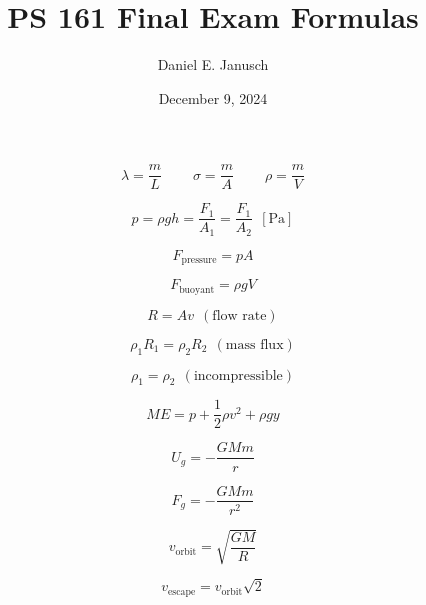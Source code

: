 \documentclass[12pt]{article}
\begin{document}

\title{PS 161 Final Exam Formulas}
\author{Daniel E. Janusch}
\date{December 9, 2024}
\maketitle
\fi

\begin{equation}
	\lambda = \dfrac mL ~~~~~~~~~~
	\sigma = \dfrac mA ~~~~~~~~~~
	\rho = \dfrac mV
\end{equation}

\begin{equation}
	p = \rho g h = \dfrac{F_1}{A_1} = \dfrac{F_1}{A_2}~~[\text{Pa}]
\end{equation}

\begin{equation}
	F_{\text{pressure}} = p A
\end{equation}

\begin{equation}
	F_{\text{buoyant}} = \rho g V
\end{equation}

\begin{equation}
	R = A v~~(\text{flow rate})
\end{equation}

\begin{equation}
	\rho_1 R_1 = \rho_2 R_2~~(\text{mass flux})
\end{equation}

\begin{equation}
	\rho_1 = \rho_2~~(\text{incompressible})
\end{equation}

\begin{equation}
	M\!E = p + \dfrac 12 \rho v^2 + \rho g y
\end{equation}

\begin{equation}
	U_g = -\dfrac{GMm} r
\end{equation}

\begin{equation}
	F_g = -\dfrac{GMm}{r^2}
\end{equation}

\begin{equation}
	v_{\text{orbit}} = \sqrt{\dfrac{GM}{R}}
\end{equation}

\begin{equation}
	v_{\text{escape}} = v_{\text{orbit}} \sqrt 2
\end{equation}
\end{document}
